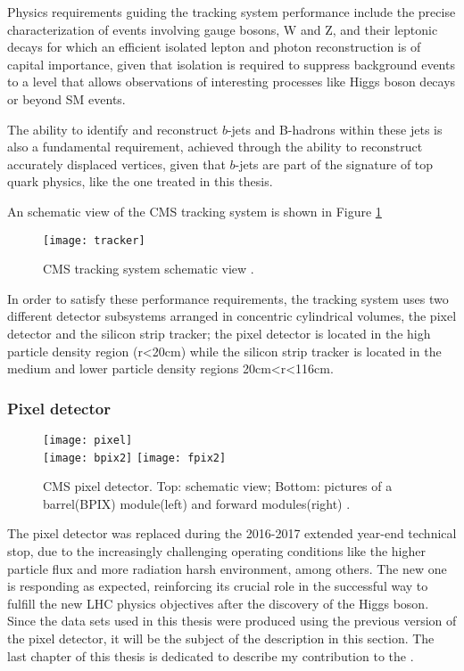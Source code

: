 Physics requirements guiding the tracking system performance include the precise characterization of events involving gauge bosons, W and Z, and their leptonic decays for which an efficient isolated lepton and photon reconstruction is of capital importance, given that isolation is required to suppress background events to a level that allows observations of interesting processes like Higgs boson decays or beyond SM events.

The ability to identify and reconstruct $b$-jets and B-hadrons within these jets is also a fundamental requirement, achieved through the ability to reconstruct accurately displaced vertices, given that $b$-jets are part of the signature of top quark physics, like the one treated in this thesis.

An schematic view of the CMS tracking system is shown in Figure \ref{fig:tracker} 

\begin{figure}[h!]
  \centering
  \texttt{[image: tracker]}
  \caption[CMS tracking system schematic view.]{CMS tracking system schematic view \cite{tracker}.}
  \label{fig:tracker}
\end{figure}

In order to satisfy these performance requirements, the tracking system uses two different detector subsystems arranged in concentric cylindrical volumes, the pixel detector and the silicon strip tracker; the pixel detector is located in the high particle density region (r<20cm) while the silicon strip tracker is located in the medium and lower particle density regions 20cm<r<116cm.        

\subsubsection*{Pixel detector}


\begin{figure}[h!]
  \centering
  \texttt{[image: pixel]}\\
  \texttt{[image: bpix2]}
  \texttt{[image: fpix2]}
  \caption[CMS pixel detector]{CMS pixel detector. Top: schematic view; Bottom: pictures of a barrel(BPIX) module(left) and forward modules(right) \cite{cms}.}
  \label{fig:pixel_det}
\end{figure}

The pixel detector was replaced during the 2016-2017 extended year-end technical stop, due to the increasingly challenging operating conditions like the higher particle flux and more radiation harsh environment, among others. The new one is responding as expected, reinforcing its crucial role in the successful way to fulfill the new LHC physics objectives after the discovery of the Higgs boson. Since the data sets used in this thesis were produced using the previous version of the pixel detector, it will be the subject of the description in this section. The last chapter of this thesis is dedicated to describe my contribution to the .

